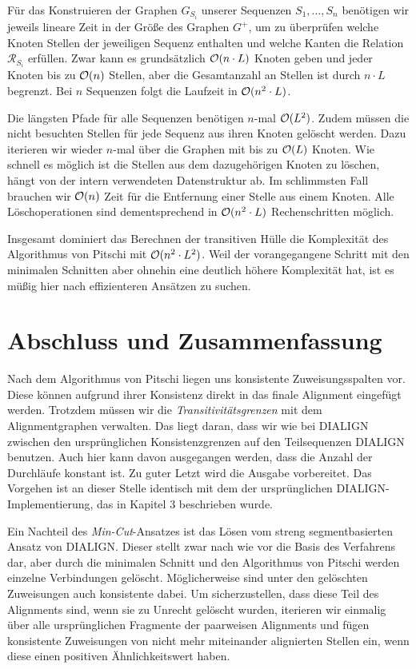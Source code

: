 Für das Konstruieren der Graphen $G_{S_i}$ unserer Sequenzen $S_1, \dots, S_n$ benötigen wir jeweils lineare Zeit in der Größe des Graphen $G^{+}$, um zu überprüfen welche Knoten Stellen der jeweiligen Sequenz enthalten und welche Kanten die Relation $\mathcal{R}_{S_i}$ erfüllen. Zwar kann es grundsätzlich $\mathcal{O}(n\cdot L)$ Knoten geben und jeder Knoten bis zu $\mathcal{O}(n)$ Stellen, aber die Gesamtanzahl an Stellen ist durch $n\cdot L$ begrenzt. Bei $n$ Sequenzen folgt die Laufzeit in $\mathcal{O}(n^2\cdot L)$.

Die längsten Pfade für alle Sequenzen benötigen $n$-mal $\mathcal{O}(L^2)$. Zudem müssen die nicht besuchten Stellen für jede Sequenz aus ihren Knoten gelöscht werden. Dazu iterieren wir wieder $n$-mal über die Graphen mit bis zu $\mathcal{O}(L)$ Knoten. Wie schnell es möglich ist die Stellen aus dem dazugehörigen Knoten zu löschen, hängt von der intern verwendeten Datenstruktur ab. Im schlimmsten Fall brauchen wir $\mathcal{O}(n)$ Zeit für die Entfernung einer Stelle aus einem Knoten. Alle Löschoperationen sind dementsprechend in $\mathcal{O}(n^2\cdot L)$ Rechenschritten möglich.

Insgesamt dominiert das Berechnen der transitiven Hülle die Komplexität des Algorithmus von Pitschi mit $\mathcal{O}(n^2\cdot L^2)$. Weil der vorangegangene Schritt mit den minimalen Schnitten aber ohnehin eine deutlich höhere Komplexität hat, ist es müßig hier nach effizienteren Ansätzen zu suchen. 

\section{Abschluss und Zusammenfassung}

Nach dem Algorithmus von Pitschi liegen uns konsistente Zuweisungsspalten vor. Diese können aufgrund ihrer Konsistenz direkt in das finale Alignment eingefügt werden. Trotzdem müssen wir die \emph{Transitivitätsgrenzen} mit dem Alignmentgraphen verwalten. Das liegt daran, dass wir wie bei DIALIGN zwischen den ursprünglichen Konsistenzgrenzen auf den Teilsequenzen DIALIGN benutzen. Auch hier kann davon ausgegangen werden, dass die Anzahl der Durchläufe konstant ist. Zu guter Letzt wird die Ausgabe vorbereitet. Das Vorgehen ist an dieser Stelle identisch mit dem der ursprünglichen DIALIGN-Implementierung, das in Kapitel 3 beschrieben wurde.

Ein Nachteil des \emph{Min-Cut}-Ansatzes ist das Lösen vom streng segmentbasierten Ansatz von DIALIGN. Dieser stellt zwar nach wie vor die Basis des Verfahrens dar, aber durch die minimalen Schnitt und den Algorithmus von Pitschi werden einzelne Verbindungen gelöscht. Möglicherweise sind unter den gelöschten Zuweisungen auch konsistente dabei. Um sicherzustellen, dass diese Teil des Alignments sind, wenn sie zu Unrecht gelöscht wurden, iterieren wir einmalig über alle ursprünglichen Fragmente der paarweisen Alignments und fügen konsistente Zuweisungen von nicht mehr miteinander alignierten Stellen ein, wenn diese einen positiven Ähnlichkeitswert haben. 

